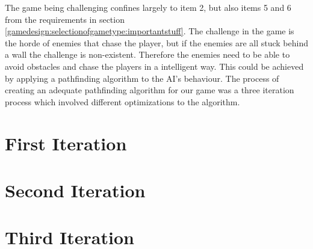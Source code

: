 The game being challenging confines largely to item 2, but also items 5 and 6 from the requirements in section \ref{gamedesign:selectionofgametype:importantstuff}.
The challenge in the game is the horde of enemies that chase the player, but if the enemies are all stuck behind a wall the challenge is non-existent.
Therefore the enemies need to be able to avoid obstacles and chase the players in a intelligent way.
This could be achieved by applying a pathfinding algorithm to the AI's behaviour.
The process of creating an adequate pathfinding algorithm for our game was a three iteration process which involved different optimizations to the algorithm.

\section{First Iteration}

\section{Second Iteration}

\section{Third Iteration}

